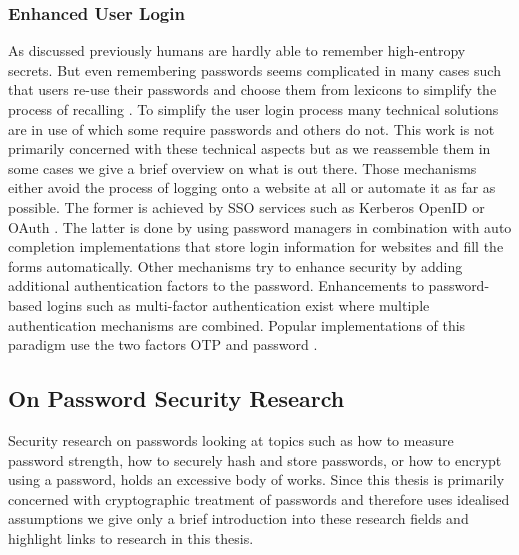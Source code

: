 \subsubsection{Enhanced User Login} \label{sec:enhanced-login}
As discussed previously humans are hardly able to remember high-entropy secrets.
But even remembering passwords seems complicated in many cases such that users re-use their passwords and choose them from lexicons to simplify the process of recalling \cite{Gaw2006,Florencio2007}.
To simplify the user login process many technical solutions are in use of which some require passwords and others do not.
This work is not primarily concerned with these technical aspects but as we reassemble them in some cases we give a brief overview on what is out there.
Those mechanisms either avoid the process of logging onto a website at all or automate it as far as possible.
The former is achieved by \ac{SSO} services such as Kerberos \cite{rfc4120} OpenID \cite{OpenID} or OAuth \cite{rfc6749}.
The latter is done by using password managers in combination with auto completion implementations that store login information for websites and fill the forms automatically.
Other mechanisms try to enhance security by adding additional authentication factors to the password.
Enhancements to password-based logins such as multi-factor authentication \cite{FleischhackerMA14} exist where multiple authentication mechanisms are combined.
Popular implementations of this paradigm use the two factors \ac{OTP} and password \cite{Google2Factor,FB2Factor,Twitter2Factor,Github2Factor}.


\subsection{On Password Security Research}
Security research on passwords looking at topics such as how to measure password strength, how to securely hash and store passwords, or how to encrypt using a password, holds an excessive body of works.
Since this thesis is primarily concerned with cryptographic treatment of passwords and therefore uses idealised assumptions we give only a brief introduction into these research fields and highlight links to research in this thesis.

